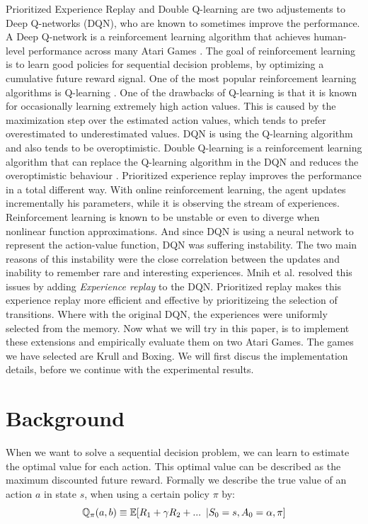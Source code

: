 \documentclass{sig-alternate}
\begin{document}
Prioritized Experience Replay \cite{schaul2015prioritized} and Double Q-learning \cite{van2016deep} are two adjustements to Deep Q-networks (DQN), who are known to sometimes improve the performance. A Deep Q-network is a reinforcement learning algorithm that achieves human-level performance across many Atari Games \cite{mnih2015human}. The goal of reinforcement learning \cite{sutton1998reinforcement} is to learn good policies for sequential decision problems, by optimizing a cumulative future reward signal. One of the most popular reinforcement learning algorithms is Q-learning \cite{watkins1992q}. One of the drawbacks of Q-learning is that it is known for occasionally learning extremely high action values. This is caused by the maximization step over the estimated action values, which tends to prefer overestimated to underestimated values. DQN is using the Q-learning algorithm and also tends to be overoptimistic. Double Q-learning is a reinforcement learning algorithm that can replace the Q-learning algorithm in the DQN and reduces the overoptimistic behaviour \cite{van2016deep}. Prioritized experience replay improves the performance in a total different way. With online reinforcement learning, the agent updates incrementally his parameters, while it is observing the stream of experiences. Reinforcement learning is known to be unstable or even to diverge when nonlinear function approximations. And since DQN is using a neural network to represent the action-value function, DQN was suffering instability. The two main reasons of this instability were the close correlation between the updates and inability to remember rare and interesting experiences. Mnih et al.  resolved this issues \cite{mnih2015human} by adding \textit{Experience replay} \cite{lin1992self} to the DQN. Prioritized replay makes this experience replay more efficient and effective by prioritizeing the selection of transitions. Where with the original DQN, the experiences were uniformly selected from the memory.  
Now what we will try in this paper, is to implement these extensions and empirically evaluate them on two Atari Games. The games we have selected are Krull and Boxing. We will first discus the implementation details, before we continue with the experimental results.
 
\section{Background}

When we want to solve a sequential decision problem, we can learn to estimate the optimal value for each action. This optimal value can be described as the maximum discounted future reward. Formally we describe the true value of an action $a$ in state $s$, when using a certain policy $\pi$ by: 
\begin{equation}  
\mathbb{Q}_{\pi}(a,b)\equiv \mathbb{E}[R_{1}+\gamma R_{2}+...\enskip| S_{0} = s, A_{0}= \alpha, \pi]
\end{equation}
\end{document}

